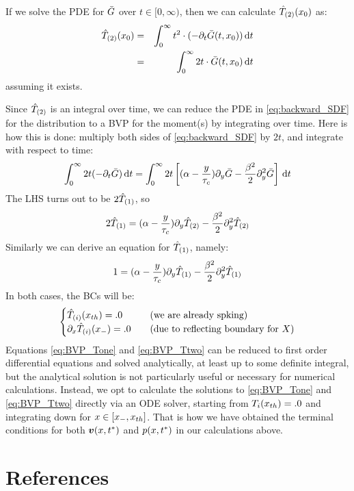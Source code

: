 \documentclass[12pt]{iopart}
\begin{document}
If we solve the PDE for ${ \bar{G} }$ over $t \in [0,\infty)$, then we can calculate
${ \hat{T}_{(2)} }(x_0)$ as:
\begin{eqnarray}
{ \hat{T}_{(2)} }(x_0) &=& \int_0^\infty t^2 \cdot (-{\partial}_t{ \bar{G} }(t,x_0)) \, \mathrm{d} t
\\
		   &=& \int_0^\infty 2t \cdot { \bar{G} }(t,x_0) \, \mathrm{d} t
\end{eqnarray}
assuming it exists.

Since ${ \hat{T}_{(2)} }$ is an integral over time, we can reduce the PDE in
\cref{eq:backward_SDF} for the distribution to a BVP for the moment(s) by
integrating over time. Here is how this is done: multiply both sides  of
\cref{eq:backward_SDF} by $2t$, and integrate with respect to time:
\begin{equation}
\int_0^\infty 2t (-{\partial}_t { \bar{G} }) \, \mathrm{d} t
=
\int_0^\infty  2t \left[ ({\alpha} - \frac y{{ \tau_{c} }}) {\partial}_y{ \bar{G} } - \frac {{\beta}^2} 2
{\partial}_y^2 { \bar{G} }\right]
\, \mathrm{d} t
\end{equation}
The LHS turns out to be $2{ \hat{T}_{(1)} }$, so
\begin{equation}
2{ \hat{T}_{(1)} }
=({\alpha} - \frac y{{ \tau_{c} }})   {\partial}_y { \hat{T}_{(2)} }
- \frac {{\beta}^2} 2
{\partial}_y^2 { \hat{T}_{(2)} }
\label{eq:BVP_Ttwo}
\end{equation}
Similarly we can derive an equation for ${ \hat{T}_{(1)} }$, namely:
\begin{equation}
1
=({\alpha} - \frac y{{ \tau_{c} }})   {\partial}_y { \hat{T}_{(1)} }
- \frac {{\beta}^2} 2
{\partial}_y^2 { \hat{T}_{(1)} }
\label{eq:BVP_Tone}
\end{equation}
In both cases, the BCs will be:
\begin{equation}
\begin{cases}
{ \hat{T}_{(i)} }({ x_{th} }) = .0 & \quad (\textrm{we are already spking})
\\
{\partial}_x { \hat{T}_{(i)} }({ x_{-} }) = .0  & \quad (\textrm{due to reflecting boundary for }X)
\end{cases}
\label{eq:BVP_Ti_BCs}
\end{equation}
Equations \ref{eq:BVP_Tone} and \ref{eq:BVP_Ttwo} can be reduced to first order
differential equations and solved analytically, at least up to some definite integral,
but the analytical solution is not particularly useful or necessary for
numerical calculations. Instead, we opt to calculate the solutions to
\ref{eq:BVP_Tone} and \ref{eq:BVP_Ttwo} directly via an ODE solver, starting
from $T_i({ x_{th} }) = .0$ and integrating down for $x  \in [{ x_{-} }, { x_{th} }]$.
That is how we have obtained the terminal conditions for both ${ \boldsymbol{v} }(x,{ t^* })$ and
$p(x,{ t^* })$ in our calculations above.




\section*{References}


\end{document}
